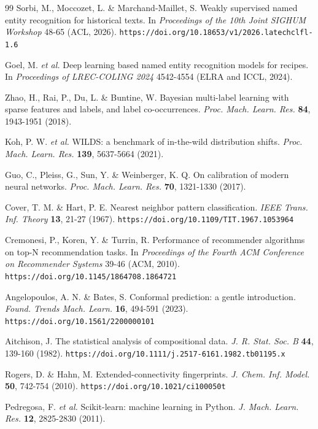 \documentclass[12pt]{article}
\begin{document}
\begin{thebibliography}{99}
Sorbi, M., Moccozet, L. \& Marchand-Maillet, S. Weakly supervised named entity recognition for historical texts. In \emph{Proceedings of the 10th Joint SIGHUM Workshop} 48-65 (ACL, 2026). \nolinkurl{https://doi.org/10.18653/v1/2026.latechclfl-1.6}

Goel, M. \emph{et al.} Deep learning based named entity recognition models for recipes. In \emph{Proceedings of LREC-COLING 2024} 4542-4554 (ELRA and ICCL, 2024).

Zhao, H., Rai, P., Du, L. \& Buntine, W. Bayesian multi-label learning with sparse features and labels, and label co-occurrences. \emph{Proc. Mach. Learn. Res.} \textbf{84}, 1943-1951 (2018).

Koh, P. W. \emph{et al.} WILDS: a benchmark of in-the-wild distribution shifts. \emph{Proc. Mach. Learn. Res.} \textbf{139}, 5637-5664 (2021).

Guo, C., Pleiss, G., Sun, Y. \& Weinberger, K. Q. On calibration of modern neural networks. \emph{Proc. Mach. Learn. Res.} \textbf{70}, 1321-1330 (2017).

Cover, T. M. \& Hart, P. E. Nearest neighbor pattern classification. \emph{IEEE Trans. Inf. Theory} \textbf{13}, 21-27 (1967). \nolinkurl{https://doi.org/10.1109/TIT.1967.1053964}

Cremonesi, P., Koren, Y. \& Turrin, R. Performance of recommender algorithms on top-N recommendation tasks. In \emph{Proceedings of the Fourth ACM Conference on Recommender Systems} 39-46 (ACM, 2010). \nolinkurl{https://doi.org/10.1145/1864708.1864721}

Angelopoulos, A. N. \& Bates, S. Conformal prediction: a gentle introduction. \emph{Found. Trends Mach. Learn.} \textbf{16}, 494-591 (2023). \nolinkurl{https://doi.org/10.1561/2200000101}

Aitchison, J. The statistical analysis of compositional data. \emph{J. R. Stat. Soc. B} \textbf{44}, 139-160 (1982). \nolinkurl{https://doi.org/10.1111/j.2517-6161.1982.tb01195.x}

Rogers, D. \& Hahn, M. Extended-connectivity fingerprints. \emph{J. Chem. Inf. Model.} \textbf{50}, 742-754 (2010). \nolinkurl{https://doi.org/10.1021/ci100050t}

Pedregosa, F. \emph{et al.} Scikit-learn: machine learning in Python. \emph{J. Mach. Learn. Res.} \textbf{12}, 2825-2830 (2011).


\end{thebibliography}
\end{document}
